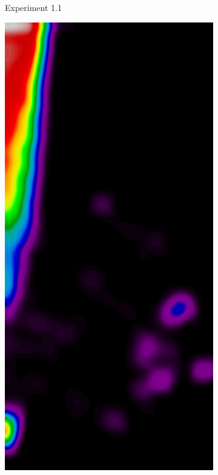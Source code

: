 \begin{figure}[h!]
\begin{subfigure}{0.195\textwidth}
		\caption{Experiment 1.1}
    \end{subfigure}
	\begin{subfigure}{0.195\textwidth}
		\centering
			\includegraphics[width=\textwidth]{plots/examples/example1_probs_1_2.png}

\end{subfigure}
\end{figure}
